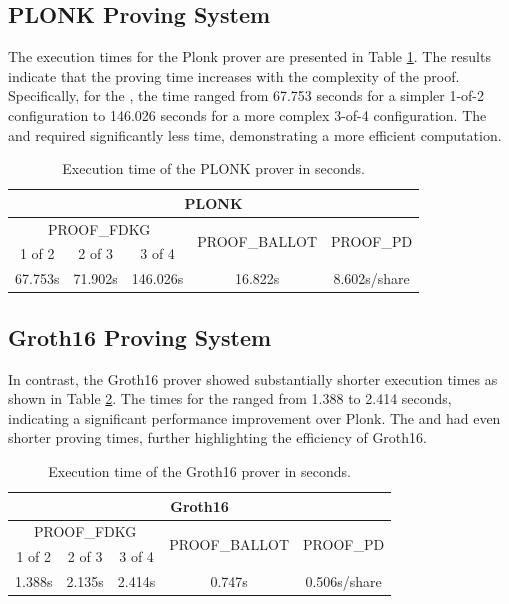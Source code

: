 \documentclass[runningheads]{llncs}
\begin{document}
\subsection{PLONK Proving System}

The execution times for the Plonk prover are presented in Table \ref{table:plonk-time}. The results indicate that the proving time increases with the complexity of the proof. Specifically, for the , the time ranged from 67.753 seconds for a simpler 1-of-2 configuration to 146.026 seconds for a more complex 3-of-4 configuration. The  and \ProofPD{} required significantly less time, demonstrating a more efficient computation.

\begin{table}
\centering
\label{table:plonk-time}
\caption{Execution time of the PLONK prover in seconds.}
\begin{tabular}{|c|c|c|c|c|}
    \hline
    \multicolumn{5}{|c|}{PLONK} \\
    \hline
    \multicolumn{3}{|c|}{\textrm{PROOF}_\textrm{FDKG}} & \multirow{2}{*}{\textrm{PROOF}_\textrm{BALLOT}} & \multirow{2}{*}{\textrm{PROOF}_\textrm{PD}} \\
    \cline{1-3}
    1 of 2 & 2 of 3 & 3 of 4 & & \\
    \hline
    67.753s & 71.902s & 146.026s & 16.822s & 8.602s/share\\
    \hline
\end{tabular}
\end{table}

\subsection{Groth16 Proving System}

In contrast, the Groth16 prover showed substantially shorter execution times as shown in Table \ref{table:groth16-time}. The times for the  ranged from 1.388 to 2.414 seconds, indicating a significant performance improvement over Plonk. The  and  had even shorter proving times, further highlighting the efficiency of Groth16.

\begin{table}
\centering
\label{table:groth16-time}
\caption{Execution time of the Groth16 prover in seconds.}
\begin{tabular}{|c|c|c|c|c|}
    \hline
    \multicolumn{5}{|c|}{Groth16} \\
    \hline
    \multicolumn{3}{|c|}{\textrm{PROOF}_\textrm{FDKG}} & \multirow{2}{*}{\textrm{PROOF}_\textrm{BALLOT}} & \multirow{2}{*}{\textrm{PROOF}_\textrm{PD}} \\
    \cline{1-3}
    1 of 2 & 2 of 3 & 3 of 4 & & \\
    \hline
    1.388s & 2.135s & 2.414s & 0.747s & 0.506s/share\\
    \hline
\end{tabular}
\end{table}
\end{document}
